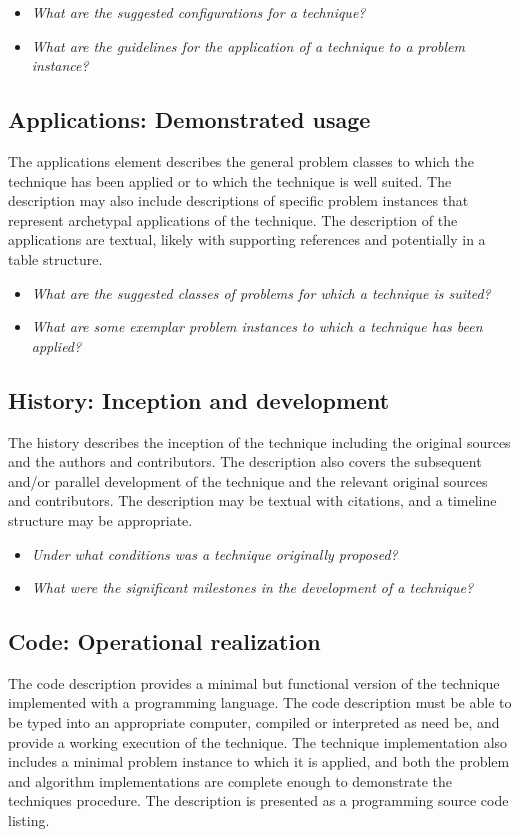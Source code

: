 \documentclass[a4paper, 11pt]{article}
\begin{document}
\begin{itemize}
	\item \emph{What are the suggested configurations for a technique?}
	\item \emph{What are the guidelines for the application of a technique to a problem instance?}
\end{itemize}

\subsection{Applications: Demonstrated usage}
The applications element describes the general problem classes to which the technique has been applied or to which the technique is well suited. The description may also include descriptions of specific problem instances that represent archetypal applications of the technique. The description of the applications are textual, likely with supporting references and potentially in a table structure. 

\begin{itemize}
	\item \emph{What are the suggested classes of problems for which a technique is suited?}
	\item \emph{What are some exemplar problem instances to which a technique has been applied?}
\end{itemize}

\subsection{History: Inception and development}
The history describes the inception of the technique including the original sources and the authors and contributors. The description also covers the subsequent and/or parallel development of the technique and the relevant original sources and contributors. The description may be textual with citations, and a timeline structure may be appropriate.

\begin{itemize}
	\item \emph{Under what conditions was a technique originally proposed?}
	\item \emph{What were the significant milestones in the development of a technique?}
\end{itemize}

\subsection{Code: Operational realization}
The code description provides a minimal but functional version of the technique implemented with a programming language. The code description must be able to be typed into an appropriate computer, compiled or interpreted as need be, and provide a working execution of the technique. The technique implementation also includes a minimal problem instance to which it is applied, and both the problem and algorithm implementations are complete enough to demonstrate the techniques procedure. The description is presented as a programming source code listing.
\end{document}
